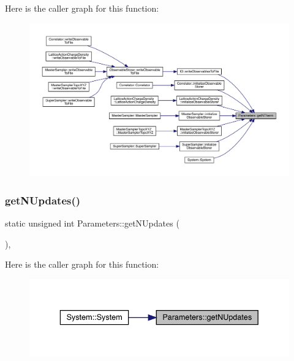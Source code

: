 Here is the caller graph for this function\+:
\nopagebreak
\begin{figure}[H]
\begin{center}
\leavevmode
\includegraphics[width=350pt]{class_parameters_ad1f56cc1bb6c19f40454b30a5bc82da6_icgraph}
\end{center}
\end{figure}
\mbox{\label{class_parameters_ac10d294b56c295bdc7e8ea4fdccb917e}} 
\subsubsection{\texorpdfstring{getNUpdates()}{getNUpdates()}}
{\footnotesize\ttfamily static unsigned int Parameters\+::get\+N\+Updates (\begin{DoxyParamCaption}{ }\end{DoxyParamCaption})\hspace{0.3cm}{\ttfamily [inline]}, {\ttfamily [static]}}

Here is the caller graph for this function\+:
\nopagebreak
\begin{figure}[H]
\begin{center}
\leavevmode
\includegraphics[width=336pt]{class_parameters_ac10d294b56c295bdc7e8ea4fdccb917e_icgraph}
\end{center}
\end{figure}
\mbox{\label{class_parameters_a5153ee54f768139539ebd3cc1a6f497d}} 
